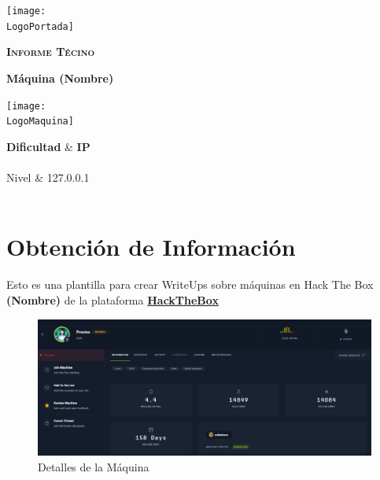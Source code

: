 \documentclass[a4paper]{article}%
\newcommand{\LogoPortada}{Imagenes/portada.png} %
\newcommand{\NombreMaquina}{(Nombre)} %
\newcommand{\LogoMaquina}{Imagenes/Previse.png} %
\begin{document}
  \cfoot{\thepage}
  \begin{titlepage}
  \centering
  \texttt{[image: \\LogoPortada]}\par\vspace{0,8cm} %
   {\scshape\LARGE\textbf{Informe Técino}\par\vspace{0,2cm}}
   {\Huge\bfseries\textcolor{greenPortada}{Máquina \NombreMaquina}\par}
   \vfill\vfill
   \texttt{[image: \\LogoMaquina]}\par\vspace{1cm}
   \vfill
    \begin{tcolorbox}[tab1,tabularx={Y||Y}]	
			{\Huge\bfseries{Dificultad}} & {\Huge\bfseries{IP}} \\ \\
			{\Large{Nivel}}  & {\Large{127.0.0.1}} \\
			\\
		\end{tcolorbox}
    \centering
   \vfill
   
   \clearpage
   \tableofcontents
   \clearpage

   \raggedright %
   \section{Obtención de Información} 
   Esto es una plantilla para crear WriteUps sobre máquinas en Hack The Box {\textbf{\NombreMaquina}} de la plataforma \href{https://hackthebox.eu}{\textbf{\color{blue}HackTheBox}}
   \vspace{0.2cm}
    \begin{figure}[h] %
        \centering
        \includegraphics[width=\textwidth]{Imagenes/Detalles.png}
        \caption{Detalles de la Máquina}
        \label{fig:detalles}
    \end{figure} 


\end{titlepage}
\end{document}
